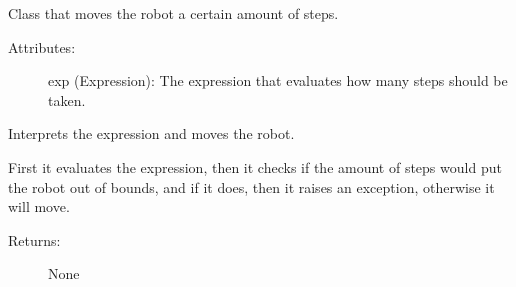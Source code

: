 \documentclass[letterpaper,10pt,english]{sphinxmanual}
\begin{document}
\begin{fulllineitems}
\label{\detokenize{statements:robol_lang.statements.Step}}
\sphinxAtStartPar
Class that moves the robot a certain amount of steps.
\begin{description}
\item[{Attributes:}] \leavevmode
\sphinxAtStartPar
exp (Expression): The expression that evaluates how many steps should
be taken.

\end{description}

\begin{fulllineitems}
\label{\detokenize{statements:robol_lang.statements.Step.interpret}}
\sphinxAtStartPar
Interprets the expression and moves the robot.

\sphinxAtStartPar
First it evaluates the expression, then it checks if the amount of
steps would put the robot out of bounds, and if it does, then it raises
an exception, otherwise it will move.
\begin{description}
\item[{Returns:}] \leavevmode
\sphinxAtStartPar
None

\end{description}

\end{fulllineitems}


\end{fulllineitems}

\end{document}
